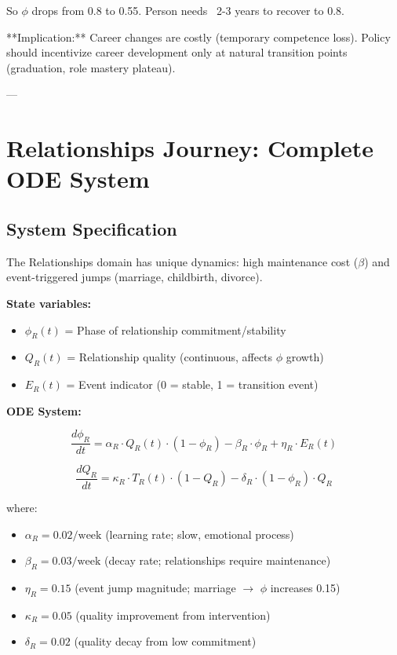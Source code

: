 So $\phi$ drops from 0.8 to 0.55. Person needs ~2-3 years to recover to 0.8.

**Implication:** Career changes are costly (temporary competence loss). Policy should incentivize career development only at natural transition points (graduation, role mastery plateau).

---


\section{Relationships Journey: Complete ODE System}
\label{ooo:relationships}

\subsection{System Specification}

The Relationships domain has unique dynamics: high maintenance cost ($\beta$) and
event-triggered jumps (marriage, childbirth, divorce).

\textbf{State variables:}
\begin{itemize}[nosep]
\item $\phi_R(t)$ = Phase of relationship commitment/stability
\item $Q_R(t)$ = Relationship quality (continuous, affects $\phi$ growth)
\item $E_R(t)$ = Event indicator (0 = stable, 1 = transition event)
\end{itemize}

\textbf{ODE System:}

\begin{equation}
\frac{d\phi_R}{dt} = \alpha_R \cdot Q_R(t) \cdot (1 - \phi_R) - \beta_R \cdot \phi_R + \eta_R \cdot E_R(t)
\label{eq:rel-phase}
\end{equation}

\begin{equation}
\frac{dQ_R}{dt} = \kappa_R \cdot T_R(t) \cdot (1 - Q_R) - \delta_R \cdot (1 - \phi_R) \cdot Q_R
\label{eq:rel-quality}
\end{equation}

where:
\begin{itemize}[nosep]
\item $\alpha_R = 0.02 / \text{week}$ (learning rate; slow, emotional process)
\item $\beta_R = 0.03 / \text{week}$ (decay rate; relationships require maintenance)
\item $\eta_R = 0.15$ (event jump magnitude; marriage $\rightarrow$ $\phi$ increases 0.15)
\item $\kappa_R = 0.05$ (quality improvement from intervention)
\item $\delta_R = 0.02$ (quality decay from low commitment)
\end{itemize}

